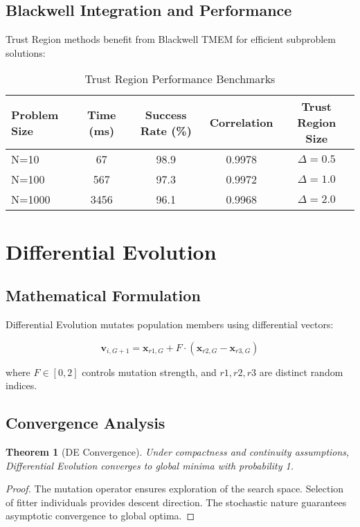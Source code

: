 \documentclass[11pt,a4paper]{article}
\newtheorem{theorem}{Theorem}[section]
\newtheorem{proof}{Proof}
\begin{document}
\subsection{Blackwell Integration and Performance}

Trust Region methods benefit from Blackwell TMEM for efficient subproblem solutions:

\begin{table}[H]
\centering
\caption{Trust Region Performance Benchmarks}
\label{tab:tr_benchmarks}
\begin{tabular}{@{}lcccc@{}}
\toprule
Problem Size & Time (ms) & Success Rate (\%) & Correlation & Trust Region Size \\
\midrule
N=10   & 67  & 98.9 & 0.9978 & $\Delta = 0.5$ \\
N=100  & 567 & 97.3 & 0.9972 & $\Delta = 1.0$ \\
N=1000 & 3456 & 96.1 & 0.9968 & $\Delta = 2.0$ \\
\bottomrule
\end{tabular}
\end{table}

\section{Differential Evolution}

\subsection{Mathematical Formulation}

Differential Evolution mutates population members using differential vectors:

\[\mathbf{v}_{i,G+1} = \mathbf{x}_{r1,G} + F \cdot (\mathbf{x}_{r2,G} - \mathbf{x}_{r3,G})\]

where $F \in [0, 2]$ controls mutation strength, and $r1, r2, r3$ are distinct random indices.

\subsection{Convergence Analysis}

\begin{theorem}[DE Convergence]
Under compactness and continuity assumptions, Differential Evolution converges to global minima with probability 1.
\end{theorem}

\begin{proof}
The mutation operator ensures exploration of the search space. Selection of fitter individuals provides descent direction. The stochastic nature guarantees asymptotic convergence to global optima.
\end{proof}
\end{document}
